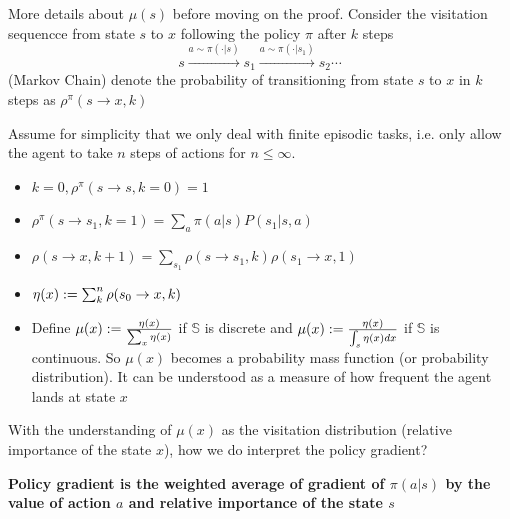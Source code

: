 \documentclass{article}
\begin{document}
More details about $\mu(s)$ before moving on the proof.
Consider the visitation sequencce from state $s$ to $x$
following the policy $\pi$ after $k$ steps
\[
  s\xrightarrow{a\sim \pi(\cdot|s)} s_1 \xrightarrow{a\sim
  \pi(\cdot|s_1)} s_2 \cdots 
\]
(Markov Chain)
denote the probability of transitioning from state $s$ to $x$ 
in $k$ steps as $\rho^{\pi}(s\rightarrow x, k)$

Assume for simplicity that we only deal with finite episodic tasks,
i.e. only allow the agent to take $n$ steps of actions for $n \le \infty$.

\begin{itemize}
  \item $k=0, \rho^{\pi}(s\rightarrow s, k=0) = 1$
  \item $\rho^{\pi}(s\rightarrow s_1, k=1)= \sum_a 
    \pi(a|s)P(s_1|s,a)$ 
  \item $\rho(s\rightarrow x, k+1) = \sum_{s_1}
    \rho(s\rightarrow s_1, k)\rho(s_1\rightarrow x, 1)$
  \item $\eta(x):= \sum_{k}^{n} \rho(s_0\rightarrow x, k)$
  \item Define $\mu(x) := \frac{\eta(x)}{\sum_x \eta(x)}$ if 
    $\mathbb{S}$ is discrete and 
    $\mu(x) := \frac{\eta(x)}{\int_s \eta(x) dx}$ if $\mathbb{S}$ 
    is continuous. 
    So $\mu(x)$ becomes a probability mass function (or probability distribution). It can be understood as a measure of how frequent the agent lands at state
    $x$
\end{itemize}

With the understanding of $\mu(x)$ as the visitation distribution (relative 
importance of the state $x$), how we do interpret the policy gradient?

\textbf{Policy gradient is the weighted average of gradient of $\pi(a|s)$
by the value of action $a$ and relative importance of the state $s$}
\end{document}
